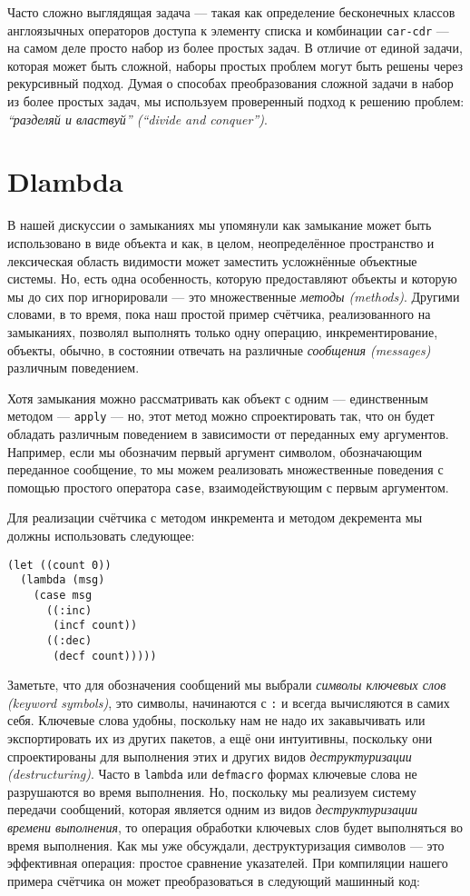 Часто сложно выглядящая задача --- такая как определение бесконечных классов англоязычных операторов доступа к элементу списка и комбинации \verb"car-cdr" --- на самом деле просто набор из более простых задач. В отличие от единой задачи, которая может быть сложной, наборы простых проблем могут быть решены через рекурсивный подход. Думая о способах преобразования сложной задачи в набор из более простых задач, мы используем проверенный подход к решению проблем: \emph{``разделяй и властвуй'' (``divide and conquer'')}.

\section{Dlambda}\label{section_dlambda}

В нашей дискуссии о замыканиях мы упомянули как замыкание может быть использовано в виде объекта и как, в целом, неопределённое пространство и лексическая область видимости может заместить усложнённые объектные системы. Но, есть одна особенность, которую предоставляют объекты и которую мы до сих пор игнорировали --- это множественные \emph{методы (methods)}. Другими словами, в то время, пока наш простой пример счётчика, реализованного на замыканиях, позволял выполнять только одну операцию, инкрементирование, объекты, обычно, в состоянии отвечать на различные \emph{сообщения (messages)} различным поведением.

Хотя замыкания можно рассматривать как объект с одним --- единственным методом --- \verb"apply" --- но, этот метод можно спроектировать так, что он будет обладать различным поведением в зависимости от переданных ему аргументов. Например, если мы обозначим первый аргумент символом, обозначающим переданное сообщение, то мы можем реализовать множественные поведения с помощью простого оператора \verb"case", взаимодействующим с первым аргументом.

Для реализации счётчика с методом инкремента и методом декремента мы должны использовать следующее:

\begin{verbatim}
(let ((count 0))
  (lambda (msg)
    (case msg
      ((:inc)
       (incf count))
      ((:dec)
       (decf count)))))
\end{verbatim}

Заметьте, что для обозначения сообщений мы выбрали \emph{символы ключевых слов (keyword symbols)}, это символы, начинаются с \verb":" и всегда вычисляются в самих себя. Ключевые слова удобны, поскольку нам не надо их закавычивать или экспортировать их из других пакетов, а ещё они интуитивны, поскольку они спроектированы для выполнения этих и других видов \emph{деструктуризации (destructuring)}. Часто в \verb"lambda" или \verb"defmacro" формах ключевые слова не разрушаются во время выполнения. Но, поскольку мы реализуем систему передачи сообщений, которая является одним из видов \emph{деструктуризации времени выполнения}, то операция обработки ключевых слов будет выполняться во время выполнения. Как мы уже обсуждали, деструктуризация символов --- это эффективная операция: простое сравнение указателей. При компиляции нашего примера счётчика он может преобразоваться в следующий машинный код:

